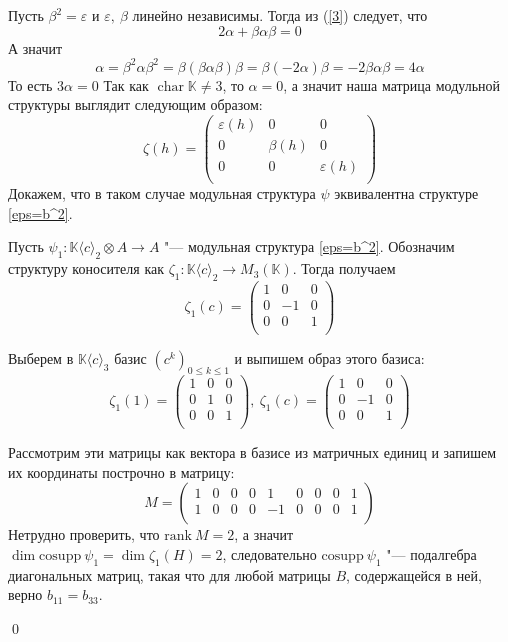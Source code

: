 \documentclass[12pt, reqno, a4paper, oneside, notitlepage]{amsart}
\makeatletter
\theoremstyle{mytheoremstyle}
\theoremstyle{myremarkstyle}
\numberwithin{equation}{section}
\renewenvironment{proof}[1][\proofname]{\par\indent {\bfseries #1\@addpunct{.} }}{\qed}
\DeclareMathOperator{\chr}{char}
\makeatother
\begin{document}
\begin{proof}
	Пусть $\beta^2 = \varepsilon$ и $\varepsilon,\ \beta$ линейно независимы.
	Тогда из (\ref{3}) следует, что
	\[
	  2\alpha +\beta\alpha\beta = 0
	\]
	А значит \[
	  \alpha = \beta^2\alpha\beta^2 = \beta(\beta\alpha\beta)\beta = \beta (-2\alpha)\beta = -2\beta\alpha\beta = 4\alpha
	\]
	То есть $3\alpha = 0$
	Так как $\chr \mathbb{K} \neq 3$, то $\alpha = 0$, а значит наша матрица модульной структуры выглядит следующим образом:\[
    \zeta(h) = \begin{pmatrix}
        \varepsilon(h) & 0 & 0\\
        0 & \beta(h) & 0\\
        0 & 0 & \varepsilon(h)\\
    \end{pmatrix}
    \]
	Докажем, что в таком случае модульная структура $\psi$ эквивалентна структуре \ref{eps=b^2}.

    Пусть $\psi_1: \mathbb{K}\langle c\rangle_2 \otimes A \to A$ "--- модульная структура \ref{eps=b^2}.
	Обозначим структуру коносителя как $\zeta_1:\mathbb{K}\langle c\rangle_2 \to M_3(\mathbb{K})$. Тогда получаем \[
    \zeta_1(c) = \begin{pmatrix}
        1 & 0 & 0\\
        0 & -1 & 0\\
        0 & 0 & 1\\
    \end{pmatrix}
    \]

    Выберем в $\mathbb{K}\langle c\rangle_3$  базис $(c^k)_{0 \leq k \leq 1}$ и выпишем образ этого базиса:
    \[
    \zeta_1(1) = \begin{pmatrix}
        1 & 0 & 0\\
        0 & 1 & 0\\
        0 & 0 & 1\\
    \end{pmatrix},\
    \zeta_1(c) = \begin{pmatrix}
        1 & 0 & 0\\
        0 & -1 & 0\\
        0 & 0 & 1\\
    \end{pmatrix}
    \]

    Рассмотрим эти матрицы как вектора в базисе из матричных единиц и запишем их координаты построчно в матрицу: \[
        M = \begin{pmatrix}
            1 & 0 & 0 & 0 & 1 & 0 & 0 & 0 & 1\\
            1 & 0 & 0 & 0 & -1 & 0 & 0 & 0 & 1\\
        \end{pmatrix}
    \]
    Нетрудно проверить, что $\mathrm{rank}\ M = 2$, а значит $\dim \mathrm{cosupp}\ \psi_1 = \dim \zeta_1(H) = 2$, следовательно $\mathrm{cosupp}\ \psi_1$ "--- подалгебра диагональных матриц, такая что для любой матрицы $B$, содержащейся в ней, верно $b_{11}=b_{33}$.


\end{proof}
\end{document}
